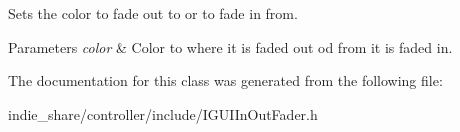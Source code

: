 Sets the color to fade out to or to fade in from. 


\begin{DoxyParams}{Parameters}
{\em color} & Color to where it is faded out od from it is faded in. \\
\hline
\end{DoxyParams}


The documentation for this class was generated from the following file\+:\begin{DoxyCompactItemize}
\item 
indie\+\_\+share/controller/include/I\+G\+U\+I\+In\+Out\+Fader.\+h\end{DoxyCompactItemize}
